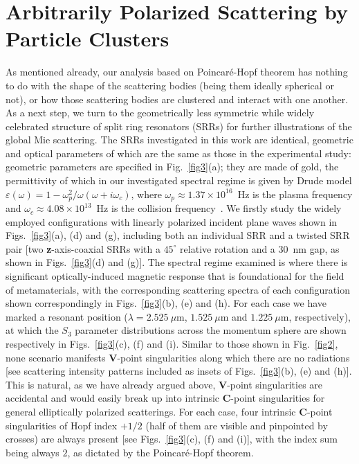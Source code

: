 \documentclass[aps,twocolumn,superscriptaddress]{revtex4-1}
\newcounter{Fig}
\begin{document}
\section{Arbitrarily Polarized Scattering by Particle Clusters}

As mentioned already, our analysis based on Poincar\'{e}-Hopf theorem has nothing to do with the shape of the scattering bodies (being them ideally spherical or not), or how those scattering bodies are clustered and interact with one another. As a next step, we turn to the geometrically less symmetric while widely celebrated structure of split ring resonators (SRRs) for further illustrations of the global Mie scattering.   The SRRs investigated in this work are identical, geometric and optical parameters of which are the same as those in the experimental study: geometric parameters are specified in Fig.~\ref{fig3}(a); they are made of gold, the permittivity of which in our investigated spectral regime is given by Drude model ${\varepsilon}(\omega ) = 1 -
\omega_p^2/\omega({\omega } + i {\omega _c })$, where ${\omega_p}\approx 1.37\times10^{16}$~Hz is the plasma frequency and ${\omega _c}\approx 4.08\times10^{13}$~Hz is the collision frequency~\cite{Linden2004_science}. We firstly study the widely employed configurations with linearly polarized incident plane waves shown in Figs.~\ref{fig3}(a), (d) and (g), including both an individual SRR and a twisted SRR pair [two \textbf{z}-axis-coaxial SRRs with a $45^\circ$ relative rotation and  a $30$~nm gap, as shown in Figs.~\ref{fig3}(d) and (g)].  The spectral regime examined is where there is significant optically-induced magnetic response that is foundational for the field of metamaterials, with the corresponding scattering spectra of each configuration shown correspondingly in Figs.~\ref{fig3}(b), (e) and (h).  For each case we have marked a resonant position ($\lambda=2.525~\mu$m, $1.525~\mu$m and $1.225~\mu$m, respectively), at which the $S_3$ parameter distributions across the momentum sphere are shown respectively in Figs.~\ref{fig3}(c), (f) and (i). Similar to those shown in Fig.~\ref{fig2}, none scenario manifests \textbf{V}-point singularities along which there are no radiations [see scattering intensity patterns included as insets of Figs.~\ref{fig3}(b), (e) and (h)]. This is natural, as we have already argued above, \textbf{V}-point singularities are accidental and would easily break up into  intrinsic \textbf{C}-point singularities for general elliptically polarized scatterings. For each case, four intrinsic \textbf{C}-point singularities of Hopf index $+1/2$ (half of them are visible and pinpointed by crosses) are always present [see Figs.~\ref{fig3}(c), (f) and (i)], with the index sum being always $2$, as dictated by the Poincar\'{e}-Hopf theorem.
\end{document}

